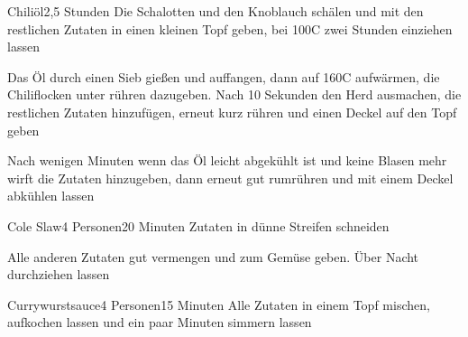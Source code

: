 
\begin{recipe}{Chiliöl}{}{2,5 Stunden}
Die Schalotten und den Knoblauch schälen und mit den restlichen Zutaten in einen kleinen Topf geben, bei 100\0C zwei Stunden einziehen lassen

Das Öl durch einen Sieb gießen und auffangen, dann auf 160\0C aufwärmen, die Chiliflocken unter rühren dazugeben. Nach 10 Sekunden den Herd ausmachen, die restlichen Zutaten hinzufügen, erneut kurz rühren und einen Deckel auf den Topf geben

Nach wenigen Minuten wenn das Öl leicht abgekühlt ist und keine Blasen mehr wirft die Zutaten hinzugeben, dann erneut gut rumrühren und mit einem Deckel abkühlen lassen
\end{recipe}


\begin{recipe}{Cole Slaw}{4 Personen}{20 Minuten}
Zutaten in dünne Streifen schneiden

Alle anderen Zutaten gut vermengen und zum Gemüse geben.
Über Nacht durchziehen lassen
\end{recipe}


\begin{recipe}{Currywurstsauce}{4 Personen}{15 Minuten}
Alle Zutaten in einem Topf mischen, aufkochen lassen und ein paar Minuten simmern lassen

\end{recipe} 

